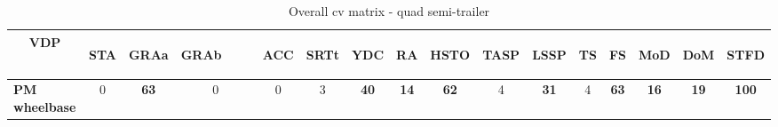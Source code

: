 \begin{table}[H]

\centering\scriptsize

\caption{Overall \gls{cv} matrix - quad semi-trailer}
\label{table:overall-cv-quad-semi}

\begin{tabular}{|l|c|c|c|c|c|c|c|c|c|c|c|c|c|c|c|}
\hline
\multicolumn{1}{|c|}{\textbf{VDP}} & \begin{sideways}\textbf{STA}\end{sideways} & \begin{sideways}\textbf{GRAa}\end{sideways} & \begin{sideways}\textbf{GRAb~~~~}\end{sideways} & \begin{sideways}\textbf{ACC}\end{sideways} & \begin{sideways}\textbf{SRTt}\end{sideways} & \begin{sideways}\textbf{YDC}\end{sideways} & \begin{sideways}\textbf{RA}\end{sideways} & \begin{sideways}\textbf{HSTO}\end{sideways} & \begin{sideways}\textbf{TASP}\end{sideways} & \begin{sideways}\textbf{LSSP}\end{sideways} & \begin{sideways}\textbf{TS}\end{sideways} & \begin{sideways}\textbf{FS}\end{sideways} & \begin{sideways}\textbf{MoD}\end{sideways} & \begin{sideways}\textbf{DoM}\end{sideways} & \begin{sideways}\textbf{STFD}\end{sideways} \bigstrut\\
\hline
\textcolor[rgb]{0.851, 0.373, 0.008}{\textbf{PM wheelbase}} & 0 & \textcolor[rgb]{0.000, 0.447, 0.698}{\textbf{63}} & 0 & 0 & 3 & \textcolor[rgb]{0.000, 0.620, 0.451}{\textbf{40}} & \textbf{14} & \textcolor[rgb]{0.000, 0.447, 0.698}{\textbf{62}} & 4 & \textcolor[rgb]{0.000, 0.620, 0.451}{\textbf{31}} & 4 & \textcolor[rgb]{0.000, 0.447, 0.698}{\textbf{63}} & \textbf{16} & \textbf{19} & \textcolor[rgb]{0.835, 0.369, 0.000}{\textbf{100}} \\

\end{tabular}
\end{table}
